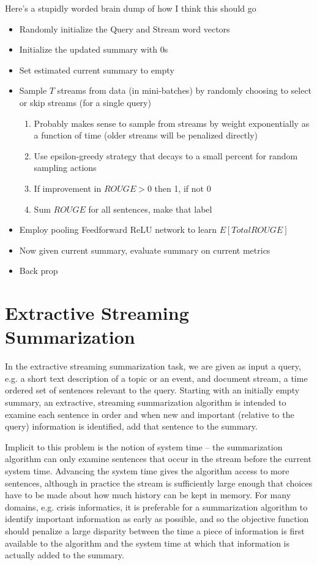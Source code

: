 \documentclass[12pt]{article}
\begin{document}
Here's a stupidly worded brain dump of how I think this should go
\begin{itemize}
\item Randomly initialize the Query and Stream word vectors
\item Initialize the updated summary with 0s
\item Set estimated current summary to empty
\item Sample $T$ streams from data (in mini-batches) by randomly choosing to select or skip streams (for a single query)
	\begin{enumerate}
		\item Probably makes sense to sample from streams by weight exponentially as a function of time (older streams will be penalized directly)
		\item Use epsilon-greedy strategy that decays to a small percent for random sampling  actions
		\item If improvement in $ROUGE>0$ then 1, if not 0
		\item Sum $ROUGE$ for all sentences, make that label
	\end{enumerate}
\item Employ pooling Feedforward ReLU network to learn $E[Total ROUGE]$
\item Now given current summary, evaluate summary on current metrics
\item Back prop
\end{itemize}
\section{Extractive Streaming Summarization}

  In the extractive streaming summarization task, we are given as input
  a query, e.g. a short text description of a topic or an event, and 
  document stream, a time ordered set of sentences 
  relevant to the query. Starting with an initially empty summary,  
  an extractive, streaming summarization algorithm is intended to 
  examine each sentence in order and when new and important (relative to the 
  query) information is identified, add that sentence to the summary. 

  Implicit to this problem is the notion of system time -- the 
  summarization algorithm can only examine sentences that occur in the stream
  before the current system time. Advancing the system time gives the algorithm
  access to more sentences, although in practice the stream is sufficiently 
  large enough that choices have to be made about how much history can be 
  kept in memory. For many domains, e.g. crisis informatics, it is preferable
  for a summarization algorithm to identify important information as early as 
  possible, and so the objective function should penalize a large disparity
  between the time a piece of information is first available to the algorithm
  and the system time at which that information is actually added to the 
  summary.
\end{document}
